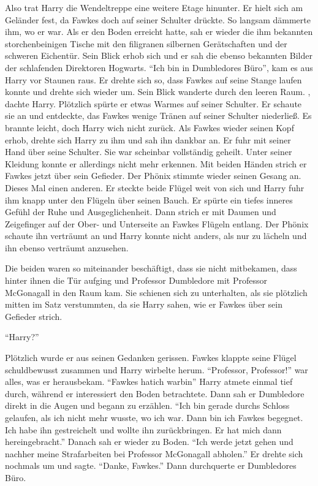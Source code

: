 Also trat Harry die Wendeltreppe eine weitere Etage hinunter. Er hielt sich am Geländer fest, da Fawkes doch auf seiner Schulter drückte. So langsam dämmerte ihm, wo er war. Als er den Boden erreicht hatte, sah er wieder die ihm bekannten storchenbeinigen Tische mit den filigranen silbernen Gerätschaften und der schweren Eichentür. Sein Blick erhob sich und er sah die ebenso bekannten Bilder der schlafenden Direktoren Hogwarts. \enquote{Ich bin in Dumbledores Büro}, kam es aus Harry vor Staunen raus. Er drehte sich so, dass Fawkes auf seine Stange laufen konnte und drehte sich wieder um. Sein Blick wanderte durch den leeren Raum. , dachte Harry. Plötzlich spürte er etwas Warmes auf seiner Schulter. Er schaute sie an und entdeckte, das Fawkes wenige Tränen auf seiner Schulter niederließ. Es brannte leicht, doch Harry wich nicht zurück. Als Fawkes wieder seinen Kopf erhob, drehte sich Harry zu ihm und sah ihn dankbar an. Er fuhr mit seiner Hand über seine Schulter. Sie war scheinbar vollständig geheilt. Unter seiner Kleidung konnte er allerdings nicht mehr erkennen. Mit beiden Händen strich er Fawkes jetzt über sein Gefieder. Der Phönix stimmte wieder seinen Gesang an. Dieses Mal einen anderen. Er steckte beide Flügel weit von sich und Harry fuhr ihm knapp unter den Flügeln über seinen Bauch. Er spürte ein tiefes inneres Gefühl der Ruhe und Ausgeglichenheit. Dann strich er mit Daumen und Zeigefinger auf der Ober- und Unterseite an Fawkes Flügeln entlang. Der Phönix schaute ihn verträumt an und Harry konnte nicht anders, als nur zu lächeln und ihn ebenso verträumt anzusehen.

Die beiden waren so miteinander beschäftigt, dass sie nicht mitbekamen, dass hinter ihnen die Tür aufging und Professor Dumbledore mit Professor McGonagall in den Raum kam. Sie schienen sich zu unterhalten, als sie plötzlich mitten im Satz verstummten, da sie Harry sahen, wie er Fawkes über sein Gefieder strich.

\enquote{Harry?}

Plötzlich wurde er aus seinen Gedanken gerissen. Fawkes klappte seine Flügel schuldbewusst zusammen und Harry wirbelte herum. \enquote{Professor, Professor!} war alles, was er herausbekam. \enquote{Fawkes hat\abs ich war\abs bin\abs} Harry atmete einmal tief durch, während er interessiert den Boden betrachtete. Dann sah er Dumbledore direkt in die Augen und begann zu erzählen. \enquote{Ich bin gerade durchs Schloss gelaufen, als ich nicht mehr wusste, wo ich war. Dann bin ich Fawkes begegnet. Ich habe ihn gestreichelt und wollte ihn zurückbringen. Er hat mich dann hereingebracht.} Danach sah er wieder zu Boden. \enquote{Ich werde jetzt gehen und nachher meine Strafarbeiten bei Professor McGonagall abholen.} Er drehte sich nochmals um und sagte. \enquote{Danke, Fawkes.} Dann durchquerte er Dumbledores Büro.


